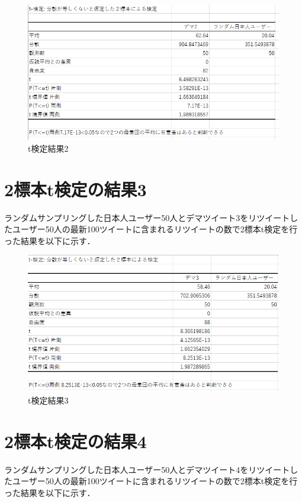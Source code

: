\begin{figure}[htb]
\centering
\includegraphics[width=13cm]{19.png}
\caption{t検定結果2}\label{31}
\end{figure}
\clearpage

\section{2標本t検定の結果3}
ランダムサンプリングした日本人ユーザー50人とデマツイート3をリツイートしたユーザー50人の最新100ツイートに含まれるリツイートの数で2標本t検定を行った結果を以下に示す．

\begin{figure}[htb]
\centering
\includegraphics[width=13cm]{20.png}
\caption{t検定結果3}\label{32}
\end{figure}
\clearpage

\section{2標本t検定の結果4}
ランダムサンプリングした日本人ユーザー50人とデマツイート4をリツイートしたユーザー50人の最新100ツイートに含まれるリツイートの数で2標本t検定を行った結果を以下に示す．

